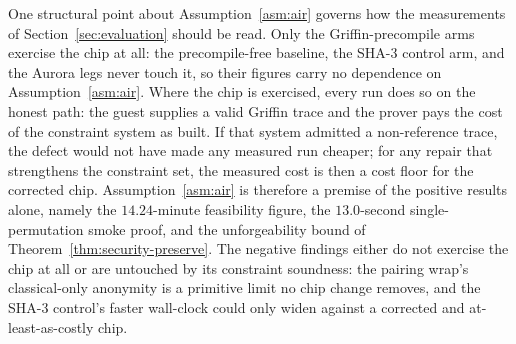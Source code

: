 One structural point about Assumption~\ref{asm:air} governs how the measurements of Section~\ref{sec:evaluation} should be read. Only the Griffin-precompile arms exercise the chip at all: the precompile-free baseline, the SHA-3 control arm, and the Aurora legs never touch it, so their figures carry no dependence on Assumption~\ref{asm:air}. Where the chip is exercised, every run does so on the honest path: the guest supplies a valid Griffin trace and the prover pays the cost of the constraint system as built. If that system admitted a non-reference trace, the defect would not have made any measured run cheaper; for any repair that strengthens the constraint set, the measured cost is then a cost floor for the corrected chip. Assumption~\ref{asm:air} is therefore a premise of the positive results alone, namely the $14.24$-minute feasibility figure, the $13.0$-second single-permutation smoke proof, and the unforgeability bound of Theorem~\ref{thm:security-preserve}. The negative findings either do not exercise the chip at all or are untouched by its constraint soundness: the pairing wrap's classical-only anonymity is a primitive limit no chip change removes, and the SHA-3 control's faster wall-clock could only widen against a corrected and at-least-as-costly chip.

